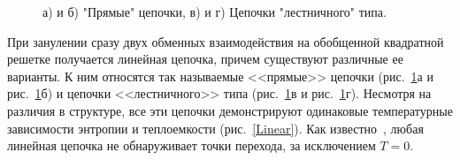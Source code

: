\documentclass[utf8,12pt]{jetp}
\begin{document}
\begin{figure}[h]
\begin{minipage}{0.45\linewidth}
	\end{minipage}
	\hfill
	\begin{minipage}{0.45\linewidth}
	\end{minipage}
	\caption{а) и б) "Прямые" цепочки, в) и г) Цепочки "лестничного" типа.}
	\label{linearChains}
\end{figure}

При занулении сразу двух обменных взаимодействия на обобщенной квадратной решетке получается линейная цепочка, причем существуют различные ее варианты. К ним относятся так называемые <<прямые>> цепочки (рис.~\ref{linearChains}а и рис.~\ref{linearChains}б) и цепочки <<лестничного>> типа (рис.~\ref{linearChains}в и рис.~\ref{linearChains}г). Несмотря на различия в структуре, все эти цепочки демонстрируют одинаковые температурные зависимости энтропии и теплоемкости (рис.~\ref{Linear}). Как известно~\cite{mussardo2010}, любая линейная цепочка не обнаруживает точки перехода, за исключением $T=0$.
\end{document}
